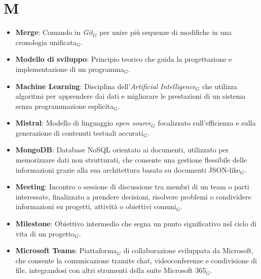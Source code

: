\section{M}
\begin{itemize}
    \item \textbf{Merge}: Comando in \textit{Git}$_G$ per unire più sequenze di modifiche in una cronologia unificata$_G$.
    \item \textbf{Modello di sviluppo}: Principio teorico che guida la progettazione e implementazione di un programma$_G$.
    \item \textbf{Machine Learning}: Disciplina dell'\textit{Artificial Intelligence}$_G$ che utilizza algoritmi per apprendere dai dati e migliorare le prestazioni di un sistema senza programmazione esplicita$_G$.
    \item \textbf{Mistral}: Modello di linguaggio \textit{open source}$_G$ focalizzato sull'efficienza e sulla generazione di contenuti testuali accurati$_G$.
    \item \textbf{MongoDB}: Database NoSQL orientato ai documenti, utilizzato per memorizzare dati non strutturati, che consente una gestione flessibile delle informazioni grazie alla sua architettura basata su documenti JSON-like$_G$.
    \item \textbf{Meeting}: Incontro o sessione di discussione tra membri di un team o parti interessate, finalizzato a prendere decisioni, risolvere problemi o condividere informazioni su progetti, attività o obiettivi comuni$_G$.
    \item \textbf{Milestone}: Obiettivo intermedio che segna un punto significativo nel ciclo di vita di un progetto$_G$.
    \item \textbf{Microsoft Teams}: Piattaforma$_G$ di collaborazione sviluppata da Microsoft, che consente la comunicazione tramite chat, videoconferenze e condivisione di file, integrandosi con altri strumenti della suite Microsoft 365$_G$.
\end{itemize}
